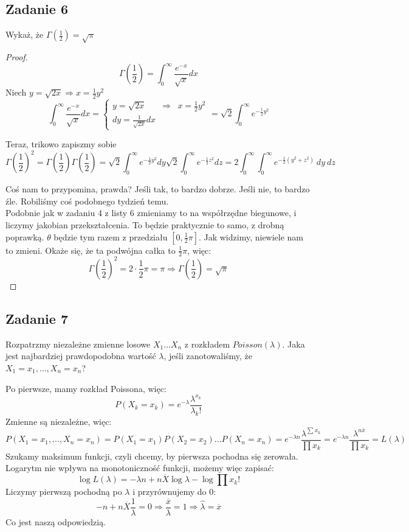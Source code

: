 \documentclass[a4paper]{article}
\begin{document}
\subsection*{Zadanie 6}
Wykaż, że $\Gamma(\frac{1}{2})=\sqrt{\pi}$

\begin{proof}
$$\Gamma\left(\frac{1}{2}\right)=\int_0^\infty \frac{e^{-x}}{\sqrt{x}} dx$$
Niech $y=\sqrt{2x} \Rightarrow x=\frac{1}{2}y^2$
$$\int_0^\infty \frac{e^{-x}}{\sqrt{x}} dx = \left\{\begin{matrix}
y=\sqrt{2x} &\Rightarrow & x=\frac{1}{2}y^2 \\ 
dy=\frac{1}{\sqrt{2x}}dx & 
\end{matrix}\right. = \sqrt{2} \int_0^\infty e^{-\frac{1}{2}y^2}$$

Teraz, trikowo zapiszmy sobie $$\Gamma\left(\frac{1}{2}\right)^2 = \Gamma\left(\frac{1}{2}\right) \Gamma\left(\frac{1}{2}\right) = \sqrt{2} \int_0^\infty e^{-\frac{1}{2}y^2}dy \sqrt{2} \int_0^\infty e^{-\frac{1}{2}z^2}dz = 2\int_0^\infty \int_0^\infty e^{-\frac{1}{2}(y^2+z^2)}\ dy\ dz$$

Coś nam to przypomina, prawda? Jeśli tak, to bardzo dobrze. Jeśli nie, to bardzo źle. Robiliśmy coś podobnego tydzień temu.\\
Podobnie jak w zadaniu 4 z listy 6 zmieniamy to na współrzędne biegunowe, i liczymy jakobian przekształcenia. To będzie praktycznie to samo, z drobną poprawką. $\theta$ będzie tym razem z przedziału $[0,\frac{1}{2}\pi]$. Jak widzimy, niewiele nam to zmieni. Okaże się, że ta podwójna całka to $\frac{1}{2}\pi$, więc: $$\Gamma\left(\frac{1}{2}\right)^2 = 2\cdot \frac{1}{2}\pi = \pi \Rightarrow \Gamma\left(\frac{1}{2}\right) = \sqrt{\pi}$$

\end{proof}

\subsection*{Zadanie 7}
Rozpatrzmy niezależne zmienne losowe $X_1 \dots X_n$ z rozkładem $Poisson(\lambda)$. Jaka jest najbardziej prawdopodobna wartość $\lambda$, jeśli zanotowaliśmy, że $X_1=x_1,\dots,X_n=x_n$?

Po pierwsze, mamy rozkład Poissona, więc:
$$P(X_k = x_k) = e^{-\lambda} \frac{\lambda^{x_k}}{\lambda_k!} $$
Zmienne są niezależne, więc:
$$P(X_1=x_1,\dots,X_n=x_n) = P(X_1=x_1)P(X_2=x_2)\dots P(X_n=x_n)=e^{-\lambda n}\frac{\lambda^{\sum x_k}}{\prod x_k} = e^{-\lambda n}\frac{\lambda^{n\overline{x}}}{\prod x_k}=L(\lambda)$$
Szukamy maksimum funkcji, czyli chcemy, by pierwsza pochodna się zerowała. Logarytm nie wpływa na monotoniczność funkcji, możemy więc zapisać:
$$\log{L(\lambda)} = -\lambda n + n \overline{X} \log{\lambda} - \log{\prod x_k!}$$
Liczymy pierwszą pochodną po $\lambda$ i przyrównujemy do 0:
$$- n + n \overline{X} \frac{1}{\lambda} =0 \Rightarrow \frac{\overline{x}}{\lambda}=1 \Rightarrow \hat{\lambda}=\overline{x}$$
Co jest naszą odpowiedzią.
\end{document}
